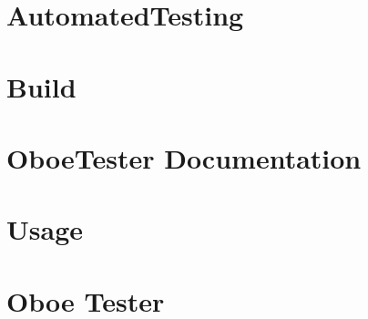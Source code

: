\let\mypdfximage\pdfximage\def\pdfximage{\immediate\mypdfximage}\documentclass[twoside]{book}
\newcommand{\+}{\discretionary{\mbox{\scriptsize$\hookleftarrow$}}{}{}}
\begin{document}
\chapter{Automated\+Testing}
\label{md__c_1__users_fab_src__github_branches__neural_amp_modeler_plugin_i_plug2__dependencies__build_f38852ba11b705a71889347caeb7a58e}

\chapter{Build}
\label{md__c_1__users_fab_src__github_branches__neural_amp_modeler_plugin_i_plug2__dependencies__build_1cb0c9df498986f8698138ae1b0a421b}

\chapter{Oboe\+Tester Documentation}
\label{md__c_1__users_fab_src__github_branches__neural_amp_modeler_plugin_i_plug2__dependencies__build_33c72648567bf1e304a5c940129654bc}

\chapter{Usage}
\label{md__c_1__users_fab_src__github_branches__neural_amp_modeler_plugin_i_plug2__dependencies__build_a7632a227d4c105fc8a4ee41bc78ffbc}

\chapter{Oboe Tester}
\label{md__c_1__users_fab_src__github_branches__neural_amp_modeler_plugin_i_plug2__dependencies__build_5c6fcb2383073105b85a9f8689052256}

\end{document}
